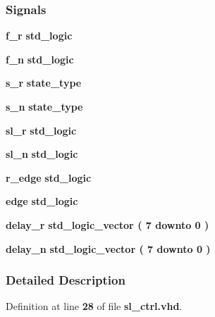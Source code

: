 \subsubsection*{Signals}
 \begin{DoxyCompactItemize}
\item 
{\bf f\+\_\+r} {\bfseries \textcolor{comment}{std\+\_\+logic}\textcolor{vhdlchar}{ }} 
\item 
{\bf f\+\_\+n} {\bfseries \textcolor{comment}{std\+\_\+logic}\textcolor{vhdlchar}{ }} 
\item 
{\bf s\+\_\+r} {\bfseries {\bfseries {\bf state\+\_\+type}} \textcolor{vhdlchar}{ }} 
\item 
{\bf s\+\_\+n} {\bfseries {\bfseries {\bf state\+\_\+type}} \textcolor{vhdlchar}{ }} 
\item 
{\bf sl\+\_\+r} {\bfseries \textcolor{comment}{std\+\_\+logic}\textcolor{vhdlchar}{ }} 
\item 
{\bf sl\+\_\+n} {\bfseries \textcolor{comment}{std\+\_\+logic}\textcolor{vhdlchar}{ }} 
\item 
{\bf r\+\_\+edge} {\bfseries \textcolor{comment}{std\+\_\+logic}\textcolor{vhdlchar}{ }} 
\item 
{\bf edge} {\bfseries \textcolor{comment}{std\+\_\+logic}\textcolor{vhdlchar}{ }} 
\item 
{\bf delay\+\_\+r} {\bfseries \textcolor{comment}{std\+\_\+logic\+\_\+vector}\textcolor{vhdlchar}{ }\textcolor{vhdlchar}{(}\textcolor{vhdlchar}{ }\textcolor{vhdlchar}{ } \textcolor{vhdldigit}{7} \textcolor{vhdlchar}{ }\textcolor{keywordflow}{downto}\textcolor{vhdlchar}{ }\textcolor{vhdlchar}{ } \textcolor{vhdldigit}{0} \textcolor{vhdlchar}{ }\textcolor{vhdlchar}{)}\textcolor{vhdlchar}{ }} 
\item 
{\bf delay\+\_\+n} {\bfseries \textcolor{comment}{std\+\_\+logic\+\_\+vector}\textcolor{vhdlchar}{ }\textcolor{vhdlchar}{(}\textcolor{vhdlchar}{ }\textcolor{vhdlchar}{ } \textcolor{vhdldigit}{7} \textcolor{vhdlchar}{ }\textcolor{keywordflow}{downto}\textcolor{vhdlchar}{ }\textcolor{vhdlchar}{ } \textcolor{vhdldigit}{0} \textcolor{vhdlchar}{ }\textcolor{vhdlchar}{)}\textcolor{vhdlchar}{ }} 
\end{DoxyCompactItemize}


\subsubsection{Detailed Description}


Definition at line {\bf 28} of file {\bf sl\+\_\+ctrl.\+vhd}.



